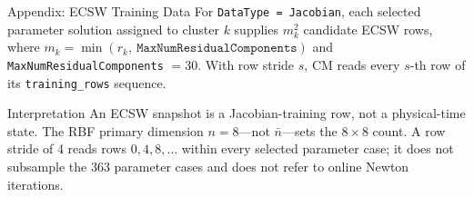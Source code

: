 \documentclass[aspectratio=169]{beamer}
\begin{document}
\begin{frame}{Appendix: ECSW Training Data}
\centering
\scriptsize
For \texttt{DataType = Jacobian}, each selected parameter solution assigned to cluster $k$ supplies
$m_k^2$ candidate ECSW rows, where
$m_k=\min\!\left(r_k,\ \texttt{MaxNumResidualComponents}\right)$ and
\texttt{MaxNumResidualComponents} $=30$. With row stride $s$, CM reads every $s$-th row of its \texttt{training\_rows} sequence.

\vspace{0.08cm}
\renewcommand{\arraystretch}{1.10}
\setlength{\tabcolsep}{3pt}

\vspace{0.08cm}
\begin{block}{Interpretation}
\tiny An ECSW snapshot is a Jacobian-training row, not a physical-time state. The RBF primary dimension $n=8$---not $\bar n$---sets the $8\times8$ count. A row stride of 4 reads rows $0,4,8,\ldots$ within every selected parameter case; it does not subsample the 363 parameter cases and does not refer to online Newton iterations.
\end{block}
\end{frame}
\end{document}

